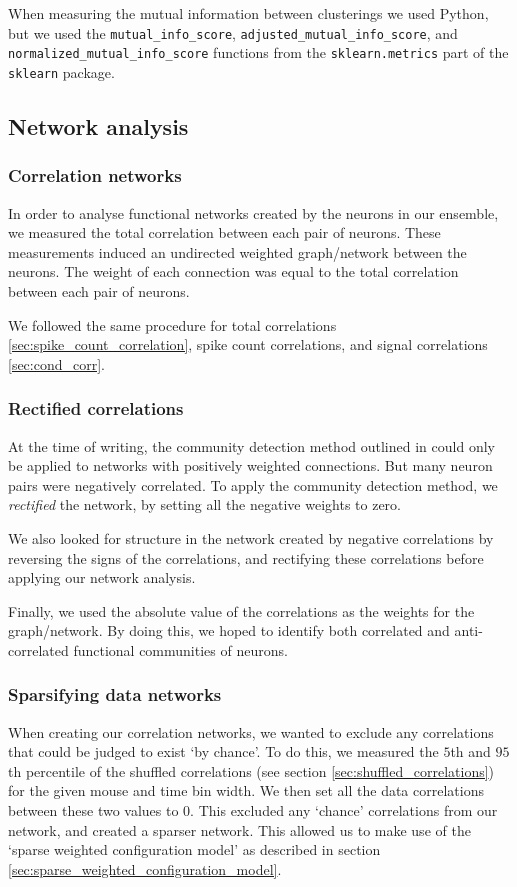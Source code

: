         When measuring the mutual information between clusterings we used Python, but we used the \texttt{mutual\_info\_score}, \texttt{adjusted\_mutual\_info\_score}, and \\ \texttt{normalized\_mutual\_info\_score} functions from the \texttt{sklearn.metrics} part of the \texttt{sklearn} package.

    \subsection{Network analysis}
        \subsubsection{Correlation networks}
        In order to analyse functional networks created by the neurons in our ensemble, we measured the total correlation between each pair of neurons. These measurements induced an undirected weighted graph/network between the neurons. The weight of each connection was equal to the total correlation between each pair of neurons.

        We followed the same procedure for total correlations \ref{sec:spike_count_correlation}, spike count correlations, and signal correlations \ref{sec:cond_corr}.

        \subsubsection{Rectified correlations}
        At the time of writing, the community detection method outlined in  \parencite{humphries} could only be applied to networks with positively weighted connections. But many neuron pairs were negatively correlated. To apply the community detection method, we \textit{rectified} the network, by setting all the negative weights to zero.

        We also looked for structure in the network created by negative correlations by reversing the signs of the correlations, and rectifying these correlations before applying our network analysis.

        Finally, we used the absolute value of the correlations as the weights for the graph/network. By doing this, we hoped to identify both correlated and anti-correlated functional communities of neurons.

        \subsubsection{Sparsifying data networks}\label{sec:sparsifying_data_networks}
        When creating our correlation networks, we wanted to exclude any correlations that could be judged to exist `by chance'. To do this, we measured the $5$th and $95$th percentile of the shuffled correlations (see section \ref{sec:shuffled_correlations}) for the given mouse and time bin width. We then set all the data correlations between these two values to $0$. This excluded any `chance' correlations from our network, and created a sparser network. This allowed us to make use of the `sparse weighted configuration model' as described in section \ref{sec:sparse_weighted_configuration_model}.

